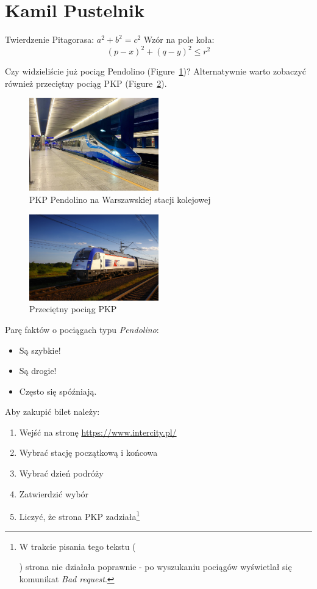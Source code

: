 \section{Kamil Pustelnik}
\label{sec:kpust}

Twierdzenie Pitagorasa: $a^2 + b^2 = c^2$
Wzór na pole koła: \[(p - x)^2 + (q - y)^2 \leq r^2\]

Czy widzieliście już pociąg Pendolino (Figure~\ref{fig:pendolino})?
Alternatywnie warto zobaczyć również przeciętny pociąg PKP (Figure~\ref{fig:pociag_pkp}).

\begin{figure}[htbp]
    \centering
    \label{fig:pendolino}
    \includegraphics[width=0.5\textwidth]{pictures/Pendolino.jpg}
    \caption{PKP Pendolino na Warszawskiej stacji kolejowej}
\end{figure}

\begin{figure}[htbp]
    \centering
    \label{fig:pociag_pkp}
    \includegraphics[width=0.5\textwidth]{pictures/pociag_pkp.jpg}
    \caption{Przeciętny pociąg PKP}
\end{figure}

Parę faktów o pociągach typu \emph{Pendolino}:
\begin{itemize}
    \item Są szybkie!
    \item Są drogie!
    \item Często się spóźniają.
\end{itemize}

Aby zakupić bilet należy:
\begin{enumerate}
    \item Wejść na stronę \url{https://www.intercity.pl/}
    \item Wybrać stację początkową i końcowa
    \item Wybrać dzień podróży
    \item Zatwierdzić wybór
    \item Liczyć, że strona PKP zadziała\footnote{W trakcie pisania tego tekstu (\date{25.10.2023}) strona nie działała poprawnie - po wyszukaniu pociągów wyświetlał się komunikat \emph{Bad request}.}
\end{enumerate}

